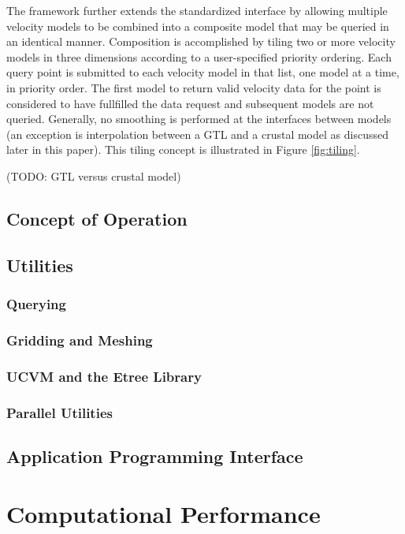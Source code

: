 The framework further extends the standardized interface by allowing multiple velocity models to be combined into a composite model that may be queried in an identical manner. Composition is accomplished by tiling two or more velocity models in three dimensions according to a user-specified priority ordering. Each query point is submitted to each velocity model in that list, one model at a time, in priority order. The first model to return valid velocity data for the point is considered to have fullfilled the data request and subsequent models are not queried. Generally, no smoothing is performed at the interfaces between models (an exception is interpolation between a GTL and a crustal model as discussed later in this paper). This tiling concept is illustrated in Figure \ref{fig:tiling}.

(TODO: GTL versus crustal model)

\subsection{Concept of Operation}

\subsection{Utilities}

\subsubsection{Querying}

\subsubsection{Gridding and Meshing}

\subsubsection{UCVM and the Etree Library}

\subsubsection{Parallel Utilities}

\subsection{Application Programming Interface}

\section{Computational Performance}
\label{sec:conclusions}

